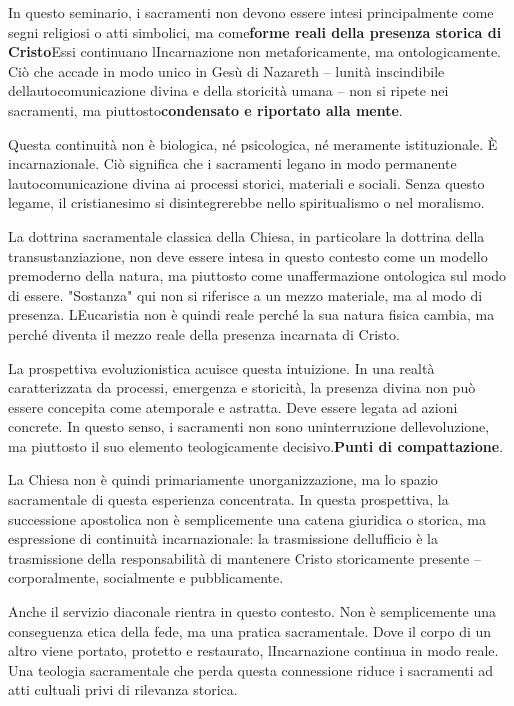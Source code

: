 \documentclass[
]{article}
\begin{document}
In questo seminario, i sacramenti non devono essere intesi principalmente come segni religiosi o atti simbolici, ma come\textbf{forme reali della presenza storica di Cristo}Essi continuano l\textquotesingle Incarnazione non metaforicamente, ma ontologicamente. Ciò che accade in modo unico in Gesù di Nazareth -- l\textquotesingle unità inscindibile dell\textquotesingle autocomunicazione divina e della storicità umana -- non si ripete nei sacramenti, ma piuttosto\textbf{condensato e riportato alla mente}.

Questa continuità non è biologica, né psicologica, né meramente istituzionale. È incarnazionale. Ciò significa che i sacramenti legano in modo permanente l\textquotesingle autocomunicazione divina ai processi storici, materiali e sociali. Senza questo legame, il cristianesimo si disintegrerebbe nello spiritualismo o nel moralismo.

La dottrina sacramentale classica della Chiesa, in particolare la dottrina della transustanziazione, non deve essere intesa in questo contesto come un modello premoderno della natura, ma piuttosto come un\textquotesingle affermazione ontologica sul modo di essere. "Sostanza" qui non si riferisce a un mezzo materiale, ma al modo di presenza. L\textquotesingle Eucaristia non è quindi reale perché la sua natura fisica cambia, ma perché diventa il mezzo reale della presenza incarnata di Cristo.

La prospettiva evoluzionistica acuisce questa intuizione. In una realtà caratterizzata da processi, emergenza e storicità, la presenza divina non può essere concepita come atemporale e astratta. Deve essere legata ad azioni concrete. In questo senso, i sacramenti non sono un\textquotesingle interruzione dell\textquotesingle evoluzione, ma piuttosto il suo elemento teologicamente decisivo.\textbf{Punti di compattazione}.

La Chiesa non è quindi primariamente un\textquotesingle organizzazione, ma lo spazio sacramentale di questa esperienza concentrata. In questa prospettiva, la successione apostolica non è semplicemente una catena giuridica o storica, ma espressione di continuità incarnazionale: la trasmissione dell\textquotesingle ufficio è la trasmissione della responsabilità di mantenere Cristo storicamente presente -- corporalmente, socialmente e pubblicamente.

Anche il servizio diaconale rientra in questo contesto. Non è semplicemente una conseguenza etica della fede, ma una pratica sacramentale. Dove il corpo di un altro viene portato, protetto e restaurato, l\textquotesingle Incarnazione continua in modo reale. Una teologia sacramentale che perda questa connessione riduce i sacramenti ad atti cultuali privi di rilevanza storica.
\end{document}
